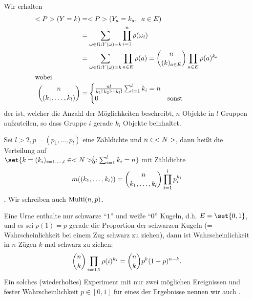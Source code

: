 
Wir erhalten
\begin{align*}
	<P>(Y = k) &= <P>(Y_a = k_a, \enskip a \in E)\\
	&= \sum_{\omega \in \Omega: Y(\omega) = k} \prod_{i=1}^{n} \rho(\omega_i)\\
	&= \sum_{\omega \in \Omega: Y(\omega) = k} \prod_{a \in E} \rho(a) = \binom{n}{(k)_{a\in E}} 
	\prod_{a \in E} \rho(a)^{k_a}\\
	\intertext{wobei}
	\binom{n}{(k_1, \dots, k_l)} &= 
	\begin{cases}
	\frac{n!}{k_1 ! \, k_2 ! \cdots k_l !} \sum_{i=1}^{l} k_i = n\\
	0 & \text{sonst }
	\end{cases}
\end{align*}
der  ist, welcher die Anzahl der Möglichkeiten beschreibt, $n$ Objekte in $l$ Gruppen aufzuteilen, so dass Gruppe $i$ gerade $k_i$ Objekte beinhaltet.

\begin{definition}
	Sei $l > 2, p = (p_1, \dots, p_l)$ eine Zähldichte und $n \in <N>$, dann heißt die Verteilung auf \\
	$\set{k = (k_i)_{i=1,\dots,l} \in \N_{0}^{l} : \sum_{i=1}^{l} k_i = n}$ mit Zähldichte
	\begin{align}
		m((k_1,\dots,k_l)) = \binom{n}{k_1, \dots, k_l}\prod_{i=1}^{l} p_i^{k_i}\notag
	\end{align}
	. Wir schreiben auch $\operatorname{Multi}(n,p)$.
\end{definition}

\begin{example}
	Eine Urne enthalte nur schwarze ``$1$'' und weiße ``$0$'' Kugeln, d.h. $E=\set{0,1}$, und es sei $\rho(1) = p$ gerade die Proportion der schwarzen Kugeln (= Wahrscheinlichkeit bei einem Zug schwarz zu ziehen), dann ist Wahrscheinlichkeit in $n$ Zügen $k$-mal schwarz zu ziehen:
	\begin{align}
		\binom{n}{k}\prod_{i=0,1} \rho(i)^{k_i} = \binom{n}{k} p^k (1-p)^{n-k}.\notag
	\end{align}
	Ein solches (wiederholtes) Experiment mit nur zwei möglichen Ereignissen und fester Wahrscheinlichkeit $p \in [0,1]$ für eines der Ergebnisse nennen wir auch .
\end{example}

